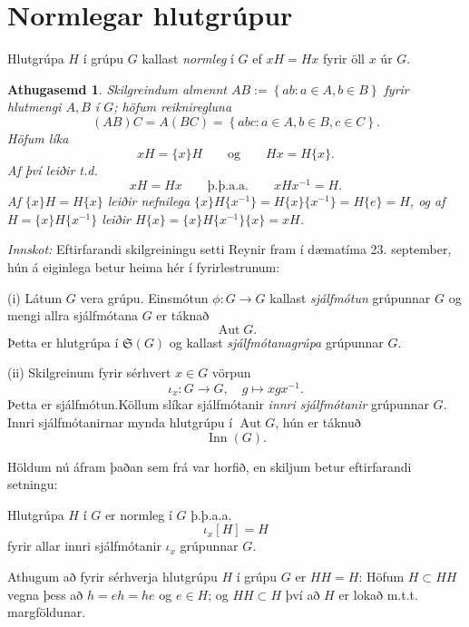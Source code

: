 \documentclass[a4paper,icelandic,11pt]{book}
\theoremstyle{plain}
\newtheorem*{ath}{Athugasemd}
\DeclareMathOperator{\Aut}{Aut} %
\DeclareMathOperator{\Inn}{Inn} %
\begin{document}
\section{Normlegar hlutgrúpur}
\begin{skilgr}
  Hlutgrúpa $H$ í grúpu $G$ kallast \emph{normleg}
  í $G$ ef $xH = Hx$ fyrir öll $x$ úr $G$.
\end{skilgr}
\begin{ath}
  Skilgreindum almennt $AB := \left\{ ab : a\in A, b\in B \right\}$ fyrir
  hlutmengi $A,B$ í $G$; höfum reikniregluna
 \[
 (AB)C = A(BC) = \left\{ abc : a\in A,b\in B,c\in C \right\}.
 \]
 Höfum líka
 \[
 xH = \{ x \}H 
 \qquad\text{og}\qquad
 Hx = H\{ x \}.
 \]
 Af því leiðir t.d.
 \[
 xH = Hx 
 \qquad \text{þ.þ.a.a.} \qquad
 xHx^{-1} = H.
 \]
 Af $\{ x \}H = H\{ x \}$ leiðir nefnilega
 $\{ x \} H \{ x^{-1}\} = H\{x\}\{x^{-1}\} = H\{e\} = H$, og af $H = \{x\} H \{
 x^{-1} \}$ leiðir $H\{x\} = \{x\} H \{x^{-1}\}\{x\} = xH $.
\end{ath}
\emph{Innskot:} Eftirfarandi skilgreiningu setti Reynir fram í dæmatíma 23.
september, hún á eiginlega betur heima hér í fyrirlestrunum:
\begin{skilgr}
  (i) Látum $G$ vera grúpu. Einsmótun $\phi:G\to G$ kallast
  \emph{sjálfmótun} grúpunnar $G$ og mengi allra sjálfmótana
  $G$ er táknað\[
  \Aut G.
  \]
  Þetta er hlutgrúpa í $\mathfrak S(G)$ og kallast
  \emph{sjálfmótanagrúpa}
  grúpunnar $G$.

  (ii) Skilgreinum fyrir sérhvert $x\in G$ vörpun \[
  \iota_x : G\to G,\quad g\mapsto xgx^{-1}.
  \]
  Þetta er sjálfmótun.\footnotemark Köllum slíkar sjálfmótanir \emph{innri
  sjálfmótanir} grúpunnar $G$.
  Innri sjálfmótanirnar mynda hlutgrúpu í $\Aut G$, hún er táknuð \[
  \Inn(G).
  \]
\end{skilgr}
Höldum nú áfram þaðan sem frá var horfið, en skiljum betur eftirfarandi setningu:
\begin{fylgisetn}
  Hlutgrúpa $H$ í $G$ er normleg í $G$ þ.þ.a.a. 
  \[
  \iota_x\left[ H \right] = H
  \]
  fyrir allar innri sjálfmótanir $\iota_x$ grúpunnar $G$.
\end{fylgisetn}
Athugum að fyrir sérhverja hlutgrúpu $H$ í grúpu $G$ er $HH = H$: Höfum
$H\subset HH$ vegna þess að $h = eh = he$ og $e\in H$; og $HH\subset H$ því að
$H$ er lokað m.t.t. margföldunar.
\end{document}
